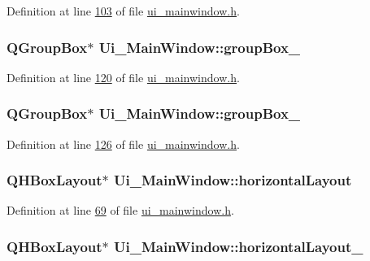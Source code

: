 Definition at line \hyperlink{a00052_source_l00103}{103} of file \hyperlink{a00052_source}{ui\+\_\+mainwindow.\+h}.

\hypertarget{a00027_a1a1fe5ec77ba52ba39a16db29ff0f91a}{
\subsubsection[{group\+Box\+\_\+8}]{\setlength{\rightskip}{0pt plus 5cm}Q\+Group\+Box$\ast$ Ui\+\_\+\+Main\+Window\+::group\+Box\+\_}}\label{a00027_a1a1fe5ec77ba52ba39a16db29ff0f91a}


Definition at line \hyperlink{a00052_source_l00120}{120} of file \hyperlink{a00052_source}{ui\+\_\+mainwindow.\+h}.

\hypertarget{a00027_ab492988d340548c7f30e098419ef10ee}{
\subsubsection[{group\+Box\+\_\+9}]{\setlength{\rightskip}{0pt plus 5cm}Q\+Group\+Box$\ast$ Ui\+\_\+\+Main\+Window\+::group\+Box\+\_}}\label{a00027_ab492988d340548c7f30e098419ef10ee}


Definition at line \hyperlink{a00052_source_l00126}{126} of file \hyperlink{a00052_source}{ui\+\_\+mainwindow.\+h}.

\hypertarget{a00027_acd6fdc9ebacc4b25b834162380d75ce8}{
\subsubsection[{horizontal\+Layout}]{\setlength{\rightskip}{0pt plus 5cm}Q\+H\+Box\+Layout$\ast$ Ui\+\_\+\+Main\+Window\+::horizontal\+Layout}}\label{a00027_acd6fdc9ebacc4b25b834162380d75ce8}


Definition at line \hyperlink{a00052_source_l00069}{69} of file \hyperlink{a00052_source}{ui\+\_\+mainwindow.\+h}.

\hypertarget{a00027_af1a7bbeee705545b94c55c297299118d}{
\subsubsection[{horizontal\+Layout\+\_\+10}]{\setlength{\rightskip}{0pt plus 5cm}Q\+H\+Box\+Layout$\ast$ Ui\+\_\+\+Main\+Window\+::horizontal\+Layout\+\_}}\label{a00027_af1a7bbeee705545b94c55c297299118d}


